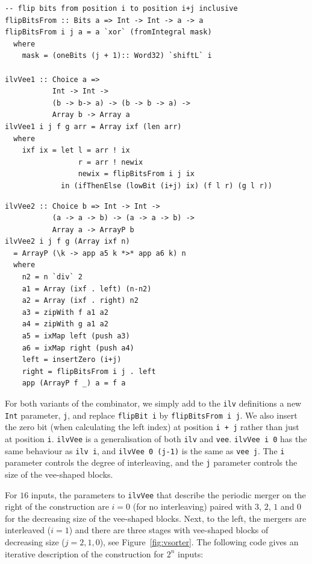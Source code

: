 \begin{codesize}
\begin{verbatim}
-- flip bits from position i to position i+j inclusive
flipBitsFrom :: Bits a => Int -> Int -> a -> a
flipBitsFrom i j a = a `xor` (fromIntegral mask)
  where
    mask = (oneBits (j + 1):: Word32) `shiftL` i

ilvVee1 :: Choice a => 
           Int -> Int -> 
           (b -> b-> a) -> (b -> b -> a) -> 
           Array b -> Array a
ilvVee1 i j f g arr = Array ixf (len arr)
  where
    ixf ix = let l = arr ! ix
                 r = arr ! newix
                 newix = flipBitsFrom i j ix
             in (ifThenElse (lowBit (i+j) ix) (f l r) (g l r))
\end{verbatim}
\end{codesize}

\begin{codesize}
\begin{verbatim}
ilvVee2 :: Choice b => Int -> Int -> 
           (a -> a -> b) -> (a -> a -> b) -> 
           Array a -> ArrayP b
ilvVee2 i j f g (Array ixf n) 
  = ArrayP (\k -> app a5 k *>* app a6 k) n
  where
    n2 = n `div` 2
    a1 = Array (ixf . left) (n-n2)
    a2 = Array (ixf . right) n2
    a3 = zipWith f a1 a2
    a4 = zipWith g a1 a2
    a5 = ixMap left (push a3)
    a6 = ixMap right (push a4)
    left = insertZero (i+j)
    right = flipBitsFrom i j . left
    app (ArrayP f _) a = f a
\end{verbatim}
\end{codesize}

For both variants of the combinator, we simply add to the {\tt ilv} definitions
a new {\tt Int} parameter, {\tt j}, and replace {\tt flipBit i} by {\tt flipBitsFrom i j}. We also insert the zero bit (when calculating the left index)
at position {\tt i + j} rather than just at position {\tt i}.
{\tt ilvVee} is a generalisation of both {\tt ilv} and {\tt vee}.
{\tt ilvVee i 0} has the same behaviour as {\tt ilv i}, and {\tt ilvVee 0 (j-1)}
is the same as {\tt vee j}. The {\tt i} parameter controls the degree
of interleaving, and the {\tt j} parameter controls the size of
the vee-shaped blocks.

For $16$ inputs, the parameters
to {\tt ilvVee} that describe the periodic merger on the right of the construction
are $i=0$ (for no interleaving) paired with $3$, $2$, $1$ and $0$
for the decreasing size of the vee-shaped blocks.
Next, to the left, the mergers are interleaved ($i=1$) and there are three
stages with
vee-shaped blocks of decreasing size ($j = 2, 1, 0$), see Figure~\ref{fig:vsorter}.
The following code gives an iterative description of the construction
for {\small $2^n$} inputs:



